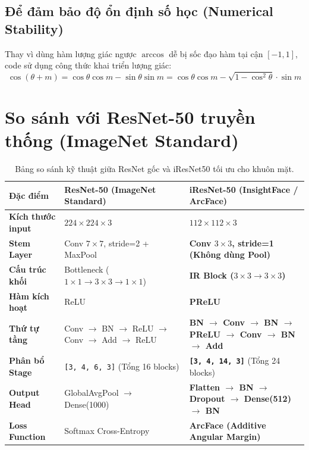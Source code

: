 \documentclass[11pt,a4paper]{article}
\begin{document}
\subsection{Để đảm bảo độ ổn định số học (Numerical Stability)}
Thay vì dùng hàm lượng giác ngược $\arccos$ dễ bị sốc đạo hàm tại cận $[-1, 1]$, code sử dụng công thức khai triển lượng giác:
\begin{equation}
\cos(\theta + m) = \cos\theta \cos m - \sin\theta \sin m = \cos\theta \cos m - \sqrt{1 - \cos^2\theta} \cdot \sin m
\end{equation}

\section{So sánh với ResNet-50 truyền thống (ImageNet Standard)}

\begin{table}[H]
\centering
\begin{tabular}{l p{5.5cm} p{6.5cm}}
\toprule
\textbf{Đặc điểm} & \textbf{ResNet-50 (ImageNet Standard)} & \textbf{iResNet-50 (InsightFace / ArcFace)} \\
\midrule
\textbf{Kích thước input} & $224 \times 224 \times 3$ & \textbf{$112 \times 112 \times 3$} \\
\textbf{Stem Layer} & Conv $7\times7$, stride=2 + MaxPool & \textbf{Conv $3\times3$, stride=1 (Không dùng Pool)} \\
\textbf{Cấu trúc khối} & Bottleneck ($1\times1 \to 3\times3 \to 1\times1$) & \textbf{IR Block ($3\times3 \to 3\times3$)} \\
\textbf{Hàm kích hoạt} & ReLU & \textbf{PReLU} \\
\textbf{Thứ tự tầng} & Conv $\to$ BN $\to$ ReLU $\to$ Conv $\to$ Add $\to$ ReLU & \textbf{BN $\to$ Conv $\to$ BN $\to$ PReLU $\to$ Conv $\to$ BN $\to$ Add} \\
\textbf{Phân bổ Stage} & \texttt{[3, 4, 6, 3]} (Tổng 16 blocks) & \textbf{\texttt{[3, 4, 14, 3]}} (Tổng 24 blocks) \\
\textbf{Output Head} & GlobalAvgPool $\to$ Dense(1000) & \textbf{Flatten $\to$ BN $\to$ Dropout $\to$ Dense(512) $\to$ BN} \\
\textbf{Loss Function} & Softmax Cross-Entropy & \textbf{ArcFace (Additive Angular Margin)} \\
\bottomrule
\end{tabular}
\caption{Bảng so sánh kỹ thuật giữa ResNet gốc và iResNet50 tối ưu cho khuôn mặt.}
\end{table}
\end{document}
